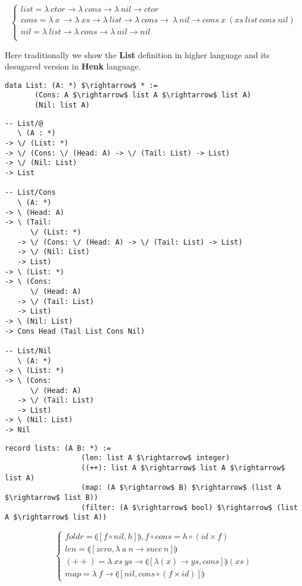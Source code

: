 \documentclass{article}
\begin{document}
$$
\begin{cases}
list = \lambda\ ctor \rightarrow \lambda\ cons \rightarrow \lambda\ nil \rightarrow ctor\\
cons = \lambda\ x\ \rightarrow \lambda\ xs \rightarrow \lambda\ list \rightarrow \lambda\ cons \rightarrow\ \lambda\ nil \rightarrow cons\ x\ (xs\ list\ cons\ nil)\\
nil = \lambda\ list \rightarrow \lambda\ cons \rightarrow \lambda\ nil \rightarrow nil\\
\end{cases}
$$

Here traditionally we show the {\bf List} definition in higher language and its
desugared version in {\bf Henk} language.

\newpage
\begin{lstlisting}[mathescape=true]
  data List: (A: *) $\rightarrow$ * :=
       (Cons: A $\rightarrow$ list A $\rightarrow$ list A)
       (Nil: list A)
\end{lstlisting}

\begin{lstlisting}[mathescape=true]
-- List/@
   \ (A : *)
-> \/ (List: *)
-> \/ (Cons: \/ (Head: A) -> \/ (Tail: List) -> List)
-> \/ (Nil: List)
-> List

-- List/Cons
   \ (A: *)
-> \ (Head: A)
-> \ (Tail:
      \/ (List: *)
   -> \/ (Cons: \/ (Head: A) -> \/ (Tail: List) -> List)
   -> \/ (Nil: List)
   -> List)
-> \ (List: *)
-> \ (Cons:
      \/ (Head: A)
   -> \/ (Tail: List)
   -> List)
-> \ (Nil: List)
-> Cons Head (Tail List Cons Nil)

-- List/Nil
   \ (A: *)
-> \ (List: *)
-> \ (Cons:
      \/ (Head: A)
   -> \/ (Tail: List)
   -> List)
-> \ (Nil: List)
-> Nil
\end{lstlisting}

\begin{lstlisting}[mathescape=true]
           record lists: (A B: *) :=
                  (len: list A $\rightarrow$ integer)
                  ((++): list A $\rightarrow$ list A $\rightarrow$ list A)
                  (map: (A $\rightarrow$ B) $\rightarrow$ (list A $\rightarrow$ list B))
                  (filter: (A $\rightarrow$ bool) $\rightarrow$ (list A $\rightarrow$ list A))
\end{lstlisting}

$$
\begin{cases}
foldr = \llparenthesis [ f \circ nil , h] \rrparenthesis, f \circ cons = h \circ (id \times f)\\
len = \llparenthesis [ zero, \lambda\ a\ n \rightarrow succ\ n ] \rrparenthesis \\
(++) = \lambda\ xs\ ys \rightarrow \llparenthesis [ \lambda (x) \rightarrow ys, cons ] \rrparenthesis (xs) \\
map = \lambda\ f \rightarrow \llparenthesis [ nil, cons \circ (f \times id)] \rrparenthesis
\end{cases}
$$
\end{document}
